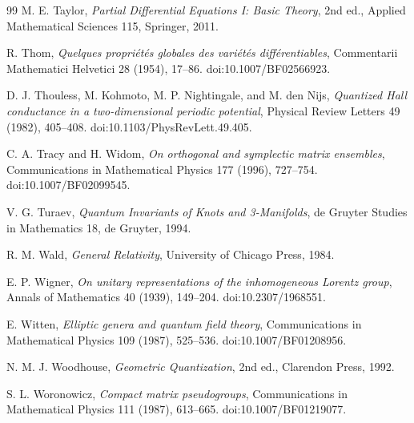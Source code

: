 \documentclass[11pt]{article}
\theoremstyle{definition}
\begin{document}
\begin{thebibliography}{99}
M. E. Taylor,
\emph{Partial Differential Equations I: Basic Theory}, 2nd ed.,
Applied Mathematical Sciences 115, Springer, 2011.

R. Thom,
\emph{Quelques propri\'et\'es globales des vari\'et\'es diff\'erentiables},
Commentarii Mathematici Helvetici 28 (1954), 17--86.
doi:10.1007/BF02566923.

D. J. Thouless, M. Kohmoto, M. P. Nightingale, and M. den Nijs,
\emph{Quantized Hall conductance in a two-dimensional periodic potential},
Physical Review Letters 49 (1982), 405--408.
doi:10.1103/PhysRevLett.49.405.

C. A. Tracy and H. Widom,
\emph{On orthogonal and symplectic matrix ensembles},
Communications in Mathematical Physics 177 (1996), 727--754.
doi:10.1007/BF02099545.

V. G. Turaev,
\emph{Quantum Invariants of Knots and 3-Manifolds},
de Gruyter Studies in Mathematics 18, de Gruyter, 1994.

R. M. Wald,
\emph{General Relativity},
University of Chicago Press, 1984.

E. P. Wigner,
\emph{On unitary representations of the inhomogeneous Lorentz group},
Annals of Mathematics 40 (1939), 149--204.
doi:10.2307/1968551.

E. Witten,
\emph{Elliptic genera and quantum field theory},
Communications in Mathematical Physics 109 (1987), 525--536.
doi:10.1007/BF01208956.

N. M. J. Woodhouse,
\emph{Geometric Quantization}, 2nd ed.,
Clarendon Press, 1992.

S. L. Woronowicz,
\emph{Compact matrix pseudogroups},
Communications in Mathematical Physics 111 (1987), 613--665.
doi:10.1007/BF01219077.

\end{thebibliography}
\end{document}
